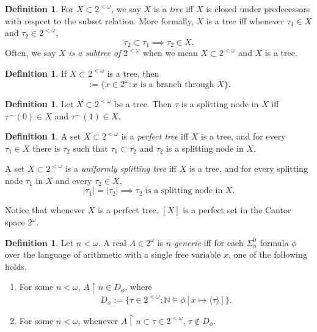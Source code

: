 \documentclass[12pt, twoside]{memoir}
\numberwithin{equation}{section}
\theoremstyle{definition}
\newtheorem{defi}[thm]{Definition}
\theoremstyle{remark}
\theoremstyle{definition}
\theoremstyle{definition}
\theoremstyle{definition}
\theoremstyle{remark}
\begin{document}
\begin{defi}
For $X \subset 2^{< \omega}$, we say $X$ is a \emph{tree} iff $X$ is closed under predecessors with respect to the subset relation. More formally, $X$ is a tree iff whenever $\tau_1 \in X$ and $\tau_2 \in 2^{< \omega}$, 
\begin{equation*}
    \tau_2 \subset \tau_1 \implies \tau_2 \in X \text{.}
\end{equation*}
Often, we say $X$ \textit{is a subtree of} $2^{<\omega}$ when we mean $X \subset 2^{< \omega}$ and $X$ is a tree.
\end{defi}

\begin{defi}
If $X \subset 2^{< \omega}$ is a tree, then
\begin{equation*}
    [X] := \{x \in 2^{\omega} : x \text{ is a branch through } X\} \text{.}
\end{equation*}
\end{defi}

\begin{defi}
Let $X \subset 2^{< \omega}$ be a tree. Then $\tau$ is a splitting node in $X$ iff $\tau^\frown (0) \in X$ and $\tau^\frown (1) \in X$.
\end{defi}

\begin{defi}
A set $X \subset 2^{< \omega}$ is a \emph{perfect tree} iff $X$ is a tree, and for every $\tau_1 \in X$ there is $\tau_2$ such that $\tau_1 \subset \tau_2$ and $\tau_2$ is a splitting node in $X$.

A set $X \subset 2^{< \omega}$ is a \emph{uniformly splitting tree} iff $X$ is a tree, and for every splitting node $\tau_1$ in $X$ and every $\tau_2 \in X$, 
\begin{equation*}
    |\tau_1| = |\tau_2| \implies \tau_2 \text{ is a splitting node in } X \text{.}
\end{equation*}
\end{defi}

Notice that whenever $X$ is a perfect tree, $[X]$ is a perfect set in the Cantor space $2^{\omega}$.

\begin{defi}
Let $n < \omega$. A real $A \in 2^{\omega}$ is $n$\emph{-generic} iff for each $\Sigma^0_n$ formula $\phi$ over the language of arithmetic with a single free variable $x$, one of the following holds.
\begin{enumerate}[label=(\alph*)]
    \item For some $n < \omega$, $A \restriction n \in D_{\phi}$, where $$D_{\phi} := \{\tau \in 2^{< \omega} : \mathbb{N} \models \phi[x \mapsto \langle \tau \rangle]\} \text{.}$$
    \item For some $n < \omega$, whenever $A \restriction n \subset \tau \in 2^{< \omega}$, $\tau \not\in D_{\phi}$.
\end{enumerate}
\end{defi}
\end{document}
